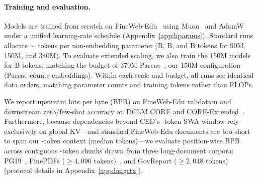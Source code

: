 \paragraph{Training and evaluation.} 
Models are trained from scratch on FineWeb-Edu~\citep{fineweb} using Muon~\citep{moonlight_muon} and AdamW under a unified learning-rate schedule (Appendix~\ref{app:hparams}). Standard runs allocate $\sim$ tokens per non-embedding parameter (B, B, and B tokens for 90M, 150M, and 340M). To evaluate extended scaling, we also train the 150M models for B tokens, matching the budget of 370M Parcae~\citep{parcae}, our 150M configuration (Parcae counts embeddings). Within each scale and budget, all runs see identical data orders, matching parameter counts and training tokens rather than FLOPs. 

We report upstream bits per byte (BPB) on FineWeb-Edu validation and downstream zero/few-shot accuracy on DCLM CORE and CORE-Extended~\citep{dclm}. Furthermore, because dependencies beyond CED's -token SWA window rely exclusively on global KV—and standard FineWeb-Edu documents are too short to span our -token context (median  tokens)—we evaluate position-wise BPB across contiguous -token chunks drawn from three long-document corpora: PG19~\citep{pg19}, FinePDFs ($\ge 4{,}096$ tokens)~\citep{kydlicek2025finepdfs}, and GovReport ($\ge 2{,}048$ tokens)~\citep{govreport} (protocol details in Appendix~\ref{app:longctx}).
